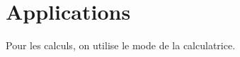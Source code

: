 \section{Applications}
\begin{remarque}
    Pour les calculs, on utilise le mode \fg{} de la calculatrice.
\end{remarque}









